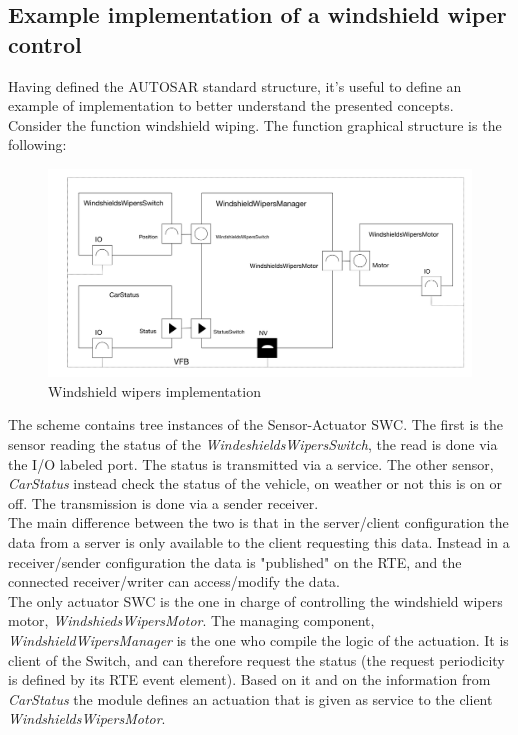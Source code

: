 \documentclass[../main.tex]{subfiles}
\begin{document}
\subsection{Example implementation of a windshield wiper control}
Having defined the \gls{AUTOSAR} standard structure, it's useful to define an example of implementation to better understand the presented concepts. Consider the function windshield wiping. The function graphical structure is the following:
\begin{figure}[H]
    \centering
    \includegraphics[width=\linewidth]{images_folder/windshield_WIpers_aUtosar.jpeg}
    \caption{Windshield wipers implementation}
    \label{fig:WINWIP}
\end{figure}
The scheme contains tree instances of the Sensor-Actuator \gls{SWC}. The first is the sensor reading the status of the \textit{WindeshieldsWipersSwitch}, the read is done via the \gls{I/O} labeled port. The status is transmitted via a service. The other sensor, \textit{CarStatus} instead check the status of the vehicle, on weather or not this is on or off. The transmission is done via a sender receiver.\\
The main difference between the two is that in the server/client configuration the data from a server is only available to the client requesting this data. Instead in a receiver/sender configuration the data is "published" on the \gls{RTE}, and the connected receiver/writer can access/modify the data.\\
The only actuator \gls{SWC} is the one in charge of controlling the windshield wipers motor, \textit{WindshiedsWipersMotor}. The managing component, \textit{WindshieldWipersManager} is the one who compile the logic of the actuation. It is client of the Switch, and can therefore request the status (the request periodicity is defined by its RTE event element). Based on it and on the information from \textit{CarStatus} the module defines an actuation that is given as service to the client \textit{WindshieldsWipersMotor}.\\
\end{document}
